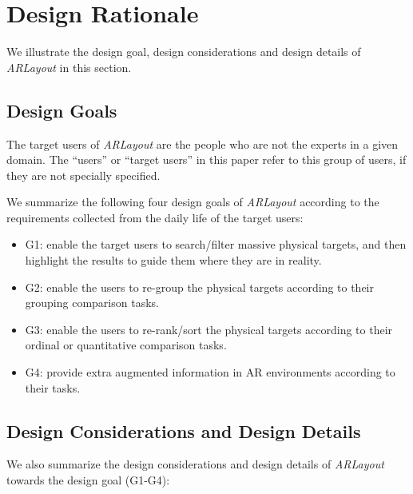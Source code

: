 \section{Design Rationale}
\label{sec:design}
We illustrate the design goal, design considerations and design details of \textit{ARLayout} in this section.

\subsection{Design Goals}

The target users of \textit{ARLayout} are the people who are not the experts in a given domain.
The ``users'' or ``target users'' in this paper refer to this group of users,
if they are not specially specified.

We summarize the following four design goals of \textit{ARLayout} according
to the requirements collected from the daily life of the target users:

\begin{itemize}
\item G1: enable the target users to search/filter massive physical targets,
and then highlight the results to guide them where they are in reality.
\item G2: enable the users to re-group the physical targets according to their grouping comparison tasks.
\item G3: enable the users to re-rank/sort the physical targets according to their ordinal or quantitative comparison tasks.  %
\item G4: provide extra augmented information in AR environments according to their tasks.
\end{itemize}



\subsection{Design Considerations and Design Details}

We also summarize the design considerations and design details of \textit{ARLayout}
towards the design goal (G1-G4):


